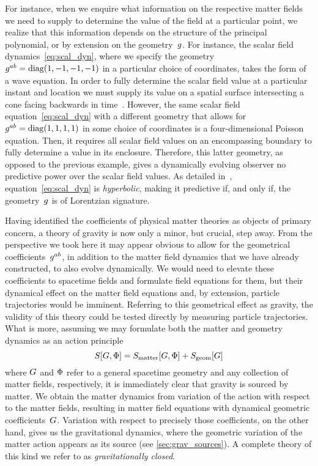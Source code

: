 For instance, when we enquire what information on the respective matter fields we need to supply to determine the value of the field at a particular point, we realize that this information depends on the structure of the principal polynomial, or by extension on the geometry~$g$. For instance, the scalar field dynamics~\eqref{eq:scal_dyn}, where we specify the geometry~$g^{ab}=\mathrm{diag}(1,-1,-1,-1)$ in a particular choice of coordinates, takes the form of a wave equation. In order to fully determine the scalar field value at a particular instant and location we must supply its value on a spatial surface intersecting a cone facing backwards in time~\autocite{DispRel2011}. However, the same scalar field equation~\eqref{eq:scal_dyn} with a different geometry that allows for $g^{ab}=\mathrm{diag}(1,1,1,1)$ in some choice of coordinates is a four-dimensional Poisson equation. Then, it requires all scalar field values on an encompassing boundary to fully determine a value in its enclosure. Therefore, this latter geometry, as opposed to the previous example, gives a dynamically evolving observer no predictive power over the scalar field values. As detailed in~\autocite{DispRel2011}, equation~\eqref{eq:scal_dyn} is \emph{hyperbolic}, making it predictive if, and only if, the geometry~$g$ is of Lorentzian signature.

Having identified the coefficients of physical matter theories as objects of primary concern, a theory of gravity is now only a minor, but crucial, step away. From the perspective we took here it may appear obvious to allow for the geometrical coefficients~$g^{ab}$, in addition to the matter field dynamics that we have already constructed, to also evolve dynamically. We would need to elevate these coefficients to spacetime fields and formulate field equations for them, but their dynamical effect on the matter field equations and, by extension, particle trajectories would be imminent. Referring to this geometrical effect as gravity, the validity of this theory could be tested directly by measuring particle trajectories. What is more, assuming we may formulate both the matter and geometry dynamics as an action principle
\begin{equation}\label{eq:act_full}
	S[G,\Phi]=S_\mathrm{matter}[G,\Phi]+S_\mathrm{geom}[G]
\end{equation}
where $G$ and $\Phi$ refer to a general spacetime geometry and any collection of matter fields, respectively, it is immediately clear that gravity is sourced by matter. We obtain the matter dynamics from variation of the action with respect to the matter fields, resulting in matter field equations with dynamical geometric coefficients~$G$. Variation with respect to precisely those coefficients, on the other hand, gives us the gravitational dynamics, where the geometric variation of the matter action appears as its source (see \autoref{sec:grav_sources}). A complete theory of this kind we refer to as \emph{gravitationally closed}.


